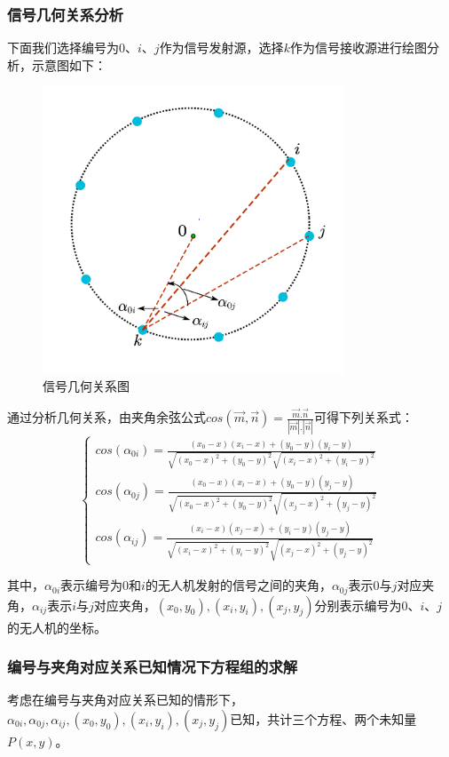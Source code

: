 \documentclass[12pt]{ctexart}
\begin{document}
\begin{spacing}{1.5}
\subsubsection{信号几何关系分析}
下面我们选择编号为0、$i$、$j$作为信号发射源，选择$k$作为信号接收源进行绘图分析，示意图如下：
\begin{figure}[H]
	\centering
	\includegraphics[width=0.8\textwidth]{信号几何关系图.png}
	\caption{信号几何关系图}
	\label{tu2}
\end{figure}
通过分析几何关系，由夹角余弦公式$cos(\vec{m},\vec{n})=\frac{\vec{m}.\vec{n}}{|\vec{m}|.|\vec{n}|}$可得下列关系式：
\begin{equation}
\begin{cases}
	cos(\alpha_{0i})= \frac{(x_0-x)(x_i-x)+(y_0-y)(y_i-y)} {\sqrt{(x_0-x)^2+(y_0-y)^2}\sqrt{(x_i-x)^2+(y_i-y)^2}}\\
	cos(\alpha_{0j})= \frac{(x_0-x)(x_i-x)+(y_0-y)(y_j-y)} {\sqrt{(x_0-x)^2+(y_0-y)^2}\sqrt{(x_j-x)^2+(y_j-y)^2}}\\
	cos(\alpha_{ij})= \frac{(x_i-x)(x_j-x)+(y_i-y)(y_j-y)} {\sqrt{(x_i-x)^2+(y_i-y)^2}\sqrt{(x_j-x)^2+(y_j-y)^2}}
\end{cases}
\label{gs1}
\end{equation}

其中，$\alpha_{0i}$表示编号为0和$i$的无人机发射的信号之间的夹角，$\alpha_{0j}$表示0与$j$对应夹角，$\alpha_{ij}$表示$i$与$j$对应夹角，$(x_0,y_0),(x_i,y_i),(x_j,y_j)$分别表示编号为$0$、$i$、$j$的无人机的坐标。

\subsubsection{编号与夹角对应关系已知情况下方程组的求解}
考虑在编号与夹角对应关系已知的情形下，$\alpha_{0i},\alpha_{0j},\alpha_{ij},(x_0,y_0),(x_i,y_i),(x_j,y_j)$已知，共计三个方程、两个未知量$P(x,y)$。


\end{spacing}
\end{document}
